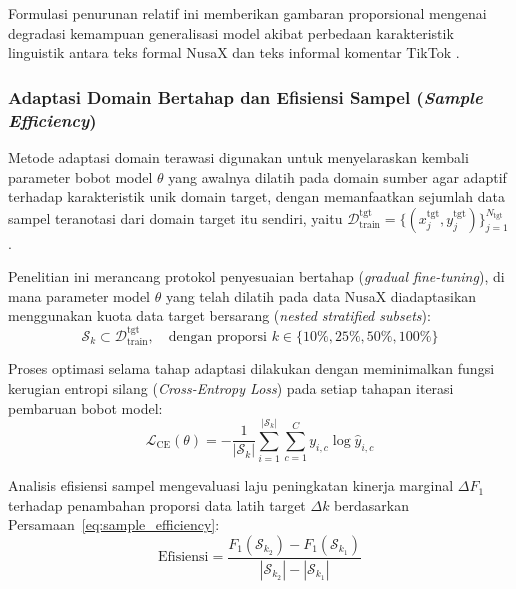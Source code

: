 Formulasi penurunan relatif ini memberikan gambaran proporsional mengenai degradasi kemampuan generalisasi model akibat perbedaan karakteristik linguistik antara teks formal NusaX dan teks informal komentar TikTok \citep{aribowo2021cross, zulkifli2025indonesian}.

\subsubsection{Adaptasi Domain Bertahap dan Efisiensi Sampel (\textit{Sample Efficiency})}

Metode adaptasi domain terawasi digunakan untuk menyelaraskan kembali parameter bobot model $\theta$ yang awalnya dilatih pada domain sumber agar adaptif terhadap karakteristik unik domain target, dengan memanfaatkan sejumlah data sampel teranotasi dari domain target itu sendiri, yaitu $\mathcal{D}_{\text{train}}^{\text{tgt}} = \{(x_j^{\text{tgt}}, y_j^{\text{tgt}})\}_{j=1}^{N_{\text{tgt}}}$ \citep{darnoto2026language, syauri2026analisis}.

Penelitian ini merancang protokol penyesuaian bertahap (\textit{gradual fine-tuning}), di mana parameter model $\theta$ yang telah dilatih pada data NusaX diadaptasikan menggunakan kuota data target bersarang (\textit{nested stratified subsets}):
\begin{equation}
\label{eq:adaptation_subsets}
\mathcal{S}_k \subset \mathcal{D}_{\text{train}}^{\text{tgt}}, \quad \text{dengan proporsi } k \in \{10\%, 25\%, 50\%, 100\%\}
\end{equation}

Proses optimasi selama tahap adaptasi dilakukan dengan meminimalkan fungsi kerugian entropi silang (\textit{Cross-Entropy Loss}) pada setiap tahapan iterasi pembaruan bobot model:
\begin{equation}
\label{eq:loss_cross_entropy}
\mathcal{L}_{\text{CE}}(\theta) = -\frac{1}{|\mathcal{S}_k|} \sum_{i=1}^{|\mathcal{S}_k|} \sum_{c=1}^{C} y_{i,c} \log \hat{y}_{i,c}
\end{equation}

Analisis efisiensi sampel mengevaluasi laju peningkatan kinerja marginal $\Delta F_1$ terhadap penambahan proporsi data latih target $\Delta k$ berdasarkan Persamaan~\eqref{eq:sample_efficiency}:
\begin{equation}
\label{eq:sample_efficiency}
\text{Efisiensi} = \frac{F_1(\mathcal{S}_{k_2}) - F_1(\mathcal{S}_{k_1})}{|\mathcal{S}_{k_2}| - |\mathcal{S}_{k_1}|}
\end{equation}

